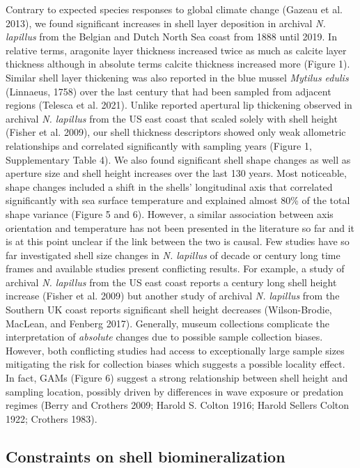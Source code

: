 \documentclass[smallextended]{svjour3}       %
\begin{document}
Contrary to expected species responses to global climate change (Gazeau
et al. 2013), we found significant increases in shell layer deposition
in archival \emph{N. lapillus} from the Belgian and Dutch North Sea
coast from 1888 until 2019. In relative terms, aragonite layer thickness
increased twice as much as calcite layer thickness although in absolute
terms calcite thickness increased more (Figure 1). Similar shell layer
thickening was also reported in the blue mussel \emph{Mytilus edulis}
(Linnaeus, 1758) over the last century that had been sampled from
adjacent regions (Telesca et al. 2021). Unlike reported apertural lip
thickening observed in archival \emph{N. lapillus} from the US east
coast that scaled solely with shell height (Fisher et al. 2009), our
shell thickness descriptors showed only weak allometric relationships
and correlated significantly with sampling years (Figure 1,
Supplementary Table 4). We also found significant shell shape changes as
well as aperture size and shell height increases over the last 130
years. Most noticeable, shape changes included a shift in the shells'
longitudinal axis that correlated significantly with sea surface
temperature and explained almost 80\% of the total shape variance
(Figure 5 and 6). However, a similar association between axis
orientation and temperature has not been presented in the literature so
far and it is at this point unclear if the link between the two is
causal. Few studies have so far investigated shell size changes in
\emph{N. lapillus} of decade or century long time frames and available
studies present conflicting results. For example, a study of archival
\emph{N. lapillus} from the US east coast reports a century long shell
height increase (Fisher et al. 2009) but another study of archival
\emph{N. lapillus} from the Southern UK coast reports significant shell
height decreases (Wilson-Brodie, MacLean, and Fenberg 2017). Generally,
museum collections complicate the interpretation of \emph{absolute}
changes due to possible sample collection biases. However, both
conflicting studies had access to exceptionally large sample sizes
mitigating the risk for collection biases which suggests a possible
locality effect. In fact, GAMs (Figure 6) suggest a strong relationship
between shell height and sampling location, possibly driven by
differences in wave exposure or predation regimes (Berry and Crothers
2009; Harold S. Colton 1916; Harold Sellers Colton 1922; Crothers 1983).

\hypertarget{constraints-on-shell-biomineralization}{%
\subsection{Constraints on shell
biomineralization}\label{constraints-on-shell-biomineralization}}
\end{document}
